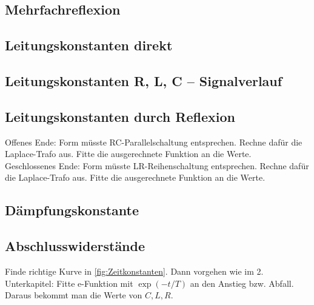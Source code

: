 \subsection{Mehrfachreflexion}

\clearpage
\subsection{Leitungskonstanten direkt}

\clearpage
\subsection{Leitungskonstanten R, L, C -- Signalverlauf}

\clearpage
\subsection{Leitungskonstanten durch Reflexion}
Offenes Ende: Form müsste RC-Parallelschaltung entsprechen. Rechne dafür die Laplace-Trafo aus. Fitte die ausgerechnete Funktion an die Werte. \\
Geschlossenes Ende: Form müsste LR-Reihenschaltung entsprechen. Rechne dafür die Laplace-Trafo aus. Fitte die ausgerechnete Funktion an die Werte.
\clearpage
\subsection{Dämpfungskonstante}

\clearpage
\subsection{Abschlusswiderstände}
Finde richtige Kurve in \ref{fig:Zeitkonstanten}. Dann vorgehen wie im 2. Unterkapitel: Fitte e-Funktion mit $\exp(-t/T)$ an den Anstieg bzw. Abfall. Daraus bekommt man die Werte von $C,L,R$.
\clearpage


